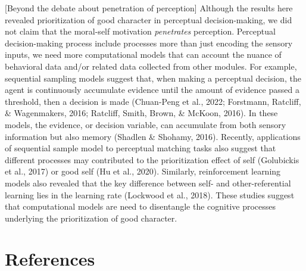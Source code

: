 \documentclass[
  man]{apa6}
\begin{document}
{[}Beyond the debate about penetration of perception{]} Although the results here revealed prioritization of good character in perceptual decision-making, we did not claim that the moral-self motivation \emph{penetrates} perception. Perceptual decision-making process include processes more than just encoding the sensory inputs, we need more computational models that can account the nuance of behavioral data and/or related data collected from other modules. For example, sequential sampling models suggest that, when making a perceptual decision, the agent is continuously accumulate evidence until the amount of evidence passed a threshold, then a decision is made (Chuan-Peng et al., 2022; Forstmann, Ratcliff, \& Wagenmakers, 2016; Ratcliff, Smith, Brown, \& McKoon, 2016). In these models, the evidence, or decision variable, can accumulate from both sensory information but also memory (Shadlen \& Shohamy, 2016). Recently, applications of sequential sample model to perceptual matching tasks also suggest that different processes may contributed to the prioritization effect of self (Golubickis et al., 2017) or good self (Hu et al., 2020). Similarly, reinforcement learning models also revealed that the key difference between self- and other-referential learning lies in the learning rate (Lockwood et al., 2018). These studies suggest that computational models are need to disentangle the cognitive processes underlying the prioritization of good character.

\hypertarget{references}{%
\section{References}\label{references}}

\begingroup
\setlength{\parindent}{-0.5in}
\setlength{\leftskip}{0.5in}
\end{document}
